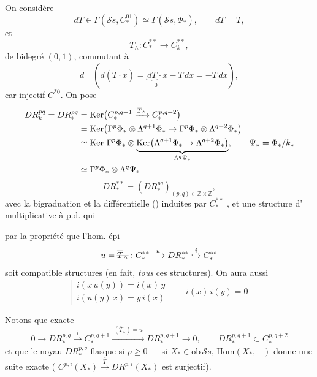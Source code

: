 \documentclass[11pt,a4paper]{article}
\begin{document}
On considère
\[
  dT \in \Gamma(\mathcal{S}s, C^{01}_*) \simeq \Gamma(\mathcal{S}s, \overline{\Phi}_*),
  \qquad dT = \overline{T},
\]
et  \ill{}
\[
  \overline{T}_\wedge : C^{**}_* \longrightarrow C^{**}_k ,
\]
de bidegré $(0, 1)$, 
commutant à
\[
  d \quad (d(\overline{T} \cdot x) = \underbrace{d\overline{T}}_{=0} \cdot x - \overline{T}\, dx = -\overline{T}\, dx),
\]
car injectif \ill{} $C^{*0}$. On pose
\begin{align*}
  DR^{pq}_k = DR^{pq}_* &= \mathrm{Ker}\bigl(C^{p,q+1}_* \xrightarrow{\overline{T}_\wedge} C^{p,q+2}_*\bigr) \\
  &= \mathrm{Ker}\bigl(\Gamma^p \Phi_* \otimes \Lambda^{q+1} \Phi_* \to \Gamma^p \Phi_* \otimes \Lambda^{q+2} \Phi_*\bigr) \\
  &\simeq \text{\struck{$\mathrm{Ker}$}}\ \Gamma^p \Phi_* \otimes
  \underbrace{\mathrm{Ker}\bigl(\Lambda^{q+1} \Phi_* \to \Lambda^{q+2} \Phi_*\bigr)}_{\Lambda^q \Psi_*} ,
  \qquad \Psi_* = \Phi_* / k_* \\
  &\simeq \Gamma^p \Phi_* \otimes \Lambda^q \Psi_*
\end{align*}
\[
  DR^{**}_* = (DR^{pq}_*)_{(p,q) \in \mathbb{Z} \times \mathbb{Z}},
\]
avec la bigraduation et la différentielle () induites par
$C^{**}_*$  \struck{\ill{}}, et une
structure d'  multiplicative 
à p.d. qui  

par la propriété que l'hom. épi
\[
  u = \text{\struck{$\overline{T}_\wedge$}} : C^{**}_* \xrightarrow{\;u\;} DR^{**}_*
  \overset{i}{\hookrightarrow} C^{**}_*
\]
soit compatible  structures (en fait, \emph{tous} ces structures). On aura aussi
\[
  \left|\begin{array}{l}
    i(x\, u(y)) = i(x)\, y \\
    i(u(y)\, x) = y\, i(x)
  \end{array}\right.
  \qquad i(x)\, i(y) = 0
\]

Notons que   exacte
\[
  0 \to DR^{p,q}_* \overset{i}{\longrightarrow} C^{p,q+1}_*
  \xrightarrow{\;(\overline{T}_\wedge) = u\;} DR^{p,q+1}_* \to 0,
  \qquad DR^{p,q+1}_* \subset C^{p,q+2}_*
\]
et que le noyau $DR^{p,q}_*$  flasque si $p \geq 0$ ---  \ill{}
si $X_* \in \mathrm{ob}\,\mathcal{S}s$, $\mathrm{Hom}(X_*, -)$ donne une suite exacte
( \struck{\ill{}} $C^{p,i}(X_*) \xrightarrow{\overline{T}} DR^{p,i}(X_*)$
est surjectif).
\end{document}
